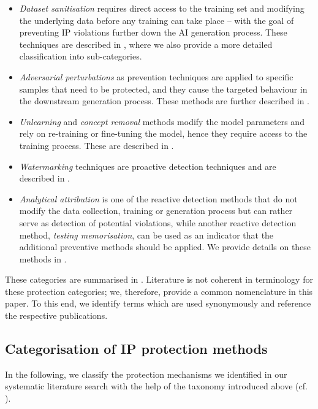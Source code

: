 \documentclass[conference,table]{IEEEtran}
\begin{document}
\begin{itemize}
    \item \textit{Dataset sanitisation} requires direct access to the training set and modifying the underlying data before any training can take place -- with the goal of preventing IP violations further down the AI generation process.
    These techniques are described in , where we also provide a more detailed classification into sub-categories. 
    \item \textit{Adversarial perturbations} as prevention techniques are applied to specific samples that need to be protected, and they cause the targeted behaviour in the downstream generation process. These methods are further described in .
    \item \textit{Unlearning} and \textit{concept removal} methods modify the model parameters and rely on re-training or fine-tuning the model, hence they require access to the training process. These are described in .
    \item \textit{Watermarking} techniques are proactive detection techniques and are described in .
    \item \textit{Analytical attribution} is one of the reactive detection methods that do not modify the data collection, training or generation process but can rather serve as detection of potential violations, while another reactive detection method, \textit{testing memorisation}, can be used as an indicator that the additional preventive methods should be applied. We provide details on these methods in .
\end{itemize}



These categories are summarised in . Literature is not coherent in terminology for these protection categories; we, therefore, provide a common nomenclature in this paper.
To this end, we identify terms which are
used synonymously and reference the respective publications.




\subsection{Categorisation of IP protection methods}\label{sec:mitigation-categories}
In the following, we classify the protection mechanisms we identified in our systematic literature search with the help of the taxonomy introduced above (cf. ).
\end{document}
